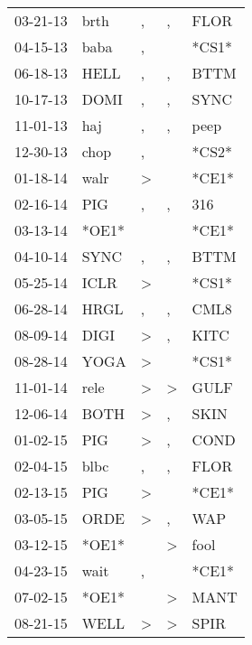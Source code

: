 \begin{supertabular}{lllll}
 03-21-13 &   brth &                , &                , &   FLOR \\
 04-15-13 &   baba &                , &                  &  *CS1* \\
 06-18-13 &   HELL &                , &                , &   BTTM \\
 10-17-13 &   DOMI &                , &                , &   SYNC \\
 11-01-13 &    haj &                , &                , &   peep \\
 12-30-13 &   chop &                , &                  &  *CS2* \\
 01-18-14 &   walr &     \textgreater &                  &  *CE1* \\
 02-16-14 &    PIG &                , &                , &    316 \\
 03-13-14 &  *OE1* &                  &                  &  *CE1* \\
 04-10-14 &   SYNC &                , &                , &   BTTM \\
 05-25-14 &   ICLR &     \textgreater &                  &  *CS1* \\
 06-28-14 &   HRGL &                , &                , &   CML8 \\
 08-09-14 &   DIGI &     \textgreater &                , &   KITC \\
 08-28-14 &   YOGA &     \textgreater &                  &  *CS1* \\
 11-01-14 &   rele &     \textgreater &     \textgreater &   GULF \\
 12-06-14 &   BOTH &     \textgreater &                , &   SKIN \\
 01-02-15 &    PIG &     \textgreater &                , &   COND \\
 02-04-15 &   blbc &                , &                , &   FLOR \\
 02-13-15 &    PIG &     \textgreater &                  &  *CE1* \\
 03-05-15 &   ORDE &     \textgreater &                , &    WAP \\
 03-12-15 &  *OE1* &                  &     \textgreater &   fool \\
 04-23-15 &   wait &                , &                  &  *CE1* \\
 07-02-15 &  *OE1* &                  &     \textgreater &   MANT \\
 08-21-15 &   WELL &     \textgreater &     \textgreater &   SPIR \\

\end{supertabular}
